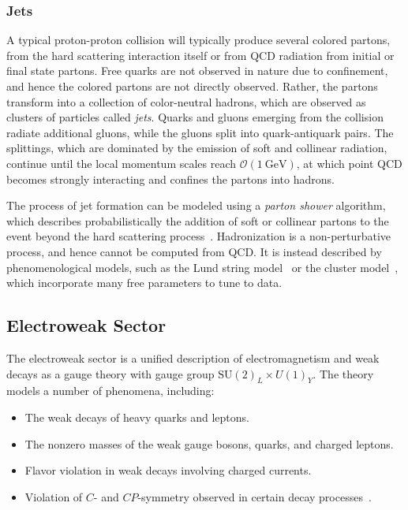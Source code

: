 \subsubsection{Jets}
A typical proton-proton collision will typically produce several colored partons, from the hard scattering interaction itself or from QCD radiation from initial or final state partons. Free quarks are not observed in nature due to confinement, and hence the colored partons are not directly observed. Rather, the partons transform into a collection of color-neutral hadrons, which are observed as clusters of particles called \emph{jets}. Quarks and gluons emerging from the collision radiate additional gluons, while the gluons split into quark-antiquark pairs. The splittings, which are dominated by the emission of soft and collinear radiation, continue until the local momentum scales reach $\mathcal{O}(\SI{1}{\giga\electronvolt})$, at which point QCD becomes strongly interacting and confines the partons into hadrons. 

The process of jet formation can be modeled using a \emph{parton shower} algorithm, which describes probabilistically the addition of soft or collinear partons to the event beyond the hard scattering process~\cite{Buckley:2011ms}. Hadronization is a non-perturbative process, and hence cannot be computed from QCD. It is instead described by phenomenological models, such as the Lund string model~\cite{Andersson:1983ia} or the cluster model~\cite{Webber:1983if}, which incorporate many free parameters to tune to data. 


\subsection{Electroweak Sector}
The electroweak sector is a unified description of electromagnetism and weak decays as a gauge theory with gauge group $\mathrm{SU}(2)_L\times U(1)_Y$. The theory models a number of phenomena, including:
\begin{itemize}
	\item The weak decays of heavy quarks and leptons.
	\item The nonzero masses of the weak gauge bosons, quarks, and charged leptons.
	\item Flavor violation in weak decays involving charged currents.
	\item Violation of $C$- and $CP$-symmetry observed in certain decay processes~\cite{Cviolation, cronin, na31, CP-bmesons}.
\end{itemize}

